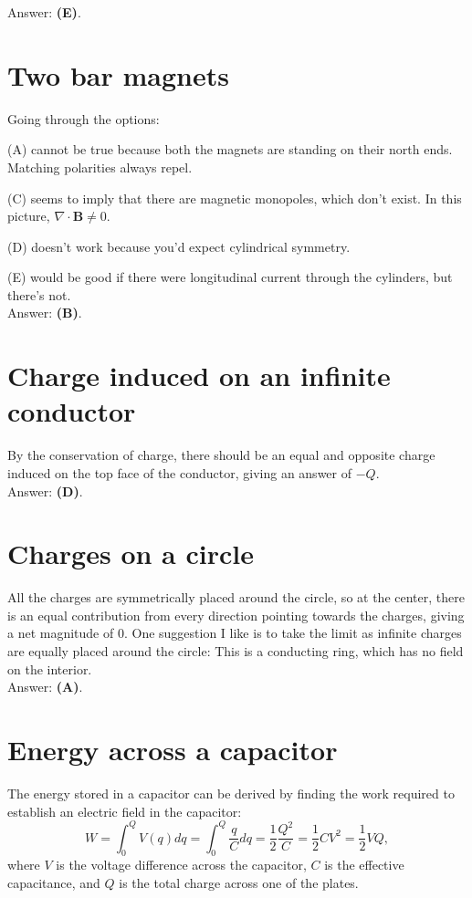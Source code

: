 \documentclass[11pt]{paper}
\newcommand{\answer}[1]{Answer: \textbf{(#1)}.}
\begin{document}
\answer{E}

\section{Two bar magnets}
Going through the options:

(A) cannot be true because both the magnets are standing on their north ends.  Matching polarities always repel.

(C) seems to imply that there are magnetic monopoles, which don't exist.  In this picture, $\nabla \cdot \mathbf{B} \neq 0$.

(D) doesn't work because you'd expect cylindrical symmetry.

(E) would be good if there were longitudinal current through the cylinders, but there's not.\\

\answer{B}

\section{Charge induced on an infinite conductor}
By the conservation of charge, there should be an equal and opposite charge induced on the top face of the conductor, giving an answer of $-Q$.\\

\answer{D}

\section{Charges on a circle}
All the charges are symmetrically placed around the circle, so at the center, there is an equal contribution from every direction pointing towards the charges, giving a net magnitude of 0.  One suggestion I like is to take the limit as infinite charges are equally placed around the circle:  This is a conducting ring, which has no field on the interior.\\

\answer{A}

\section{Energy across a capacitor}
The energy stored in a capacitor can be derived by finding the work required to establish an electric field in the capacitor:
\begin{equation}
W = \int_0^Q V(q) dq = \int_0^Q \frac{q}{C} dq = \frac{1}{2} \frac{Q^2}{C} = \frac{1}{2} CV^2 = \frac{1}{2} V Q,
\end{equation}
where $V$ is the voltage difference across the capacitor, $C$ is the effective capacitance, and $Q$ is the total charge across one of the plates.
\end{document}

